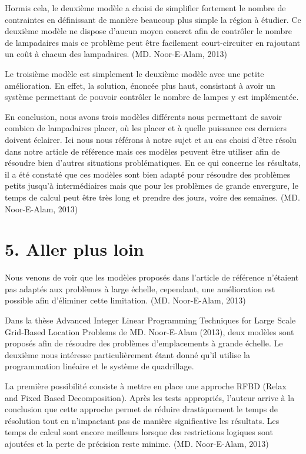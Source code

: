 Hormis cela, le deuxième modèle a choisi de simplifier fortement le nombre de contraintes en définissant de manière beaucoup plus simple la région à étudier. Ce deuxième modèle ne dispose d'aucun moyen concret afin de contrôler le nombre de lampadaires mais ce problème peut être facilement court-circuiter en rajoutant un coût à chacun des lampadaires. (MD. Noor-E-Alam, 2013)

\bigskip

Le troisième modèle est simplement le deuxième modèle avec une petite amélioration. En effet, la solution, énoncée plus haut, consistant à avoir un système permettant de pouvoir contrôler le nombre de lampes y est implémentée.

\bigskip

En conclusion, nous avons trois modèles différents nous permettant de savoir combien de lampadaires placer, où les placer et à quelle puissance ces derniers doivent éclairer. Ici nous nous référons à notre sujet et au cas choisi d'être résolu dans notre article de référence mais ces modèles peuvent être utiliser afin de résoudre bien d'autres situations problématiques. 
En ce qui concerne les résultats, il a été constaté que ces modèles sont bien adapté pour résoudre des problèmes petits jusqu'à intermédiaires mais que pour les problèmes de grande envergure, le temps de calcul peut être très long et prendre des jours, voire des semaines. (MD. Noor-E-Alam, 2013)


\chapter*{5. Aller plus loin}

\bigskip

Nous venons de voir que les modèles proposés dans l'article de référence n'étaient pas adaptés aux problèmes à large échelle, cependant,  une amélioration est possible afin d'éliminer cette limitation. (MD. Noor-E-Alam, 2013)

\bigskip

Dans la thèse Advanced Integer Linear Programming Techniques for Large Scale Grid-Based Location Problems de MD. Noor-E-Alam (2013), deux modèles sont proposés afin de résoudre des problèmes d'emplacements à grande échelle. Le deuxième nous intéresse particulièrement étant donné qu'il utilise la programmation linéaire et le système de quadrillage.

\bigskip

La première possibilité consiste à mettre en place une approche RFBD (Relax and Fixed Based Decomposition). Après les tests appropriés, l'auteur arrive à la conclusion que cette approche permet de réduire drastiquement le temps de résolution tout en n'impactant pas de manière significative les résultats. Les temps de calcul sont encore meilleurs lorsque des restrictions logiques sont ajoutées et la perte de précision reste minime. (MD. Noor-E-Alam, 2013) 


